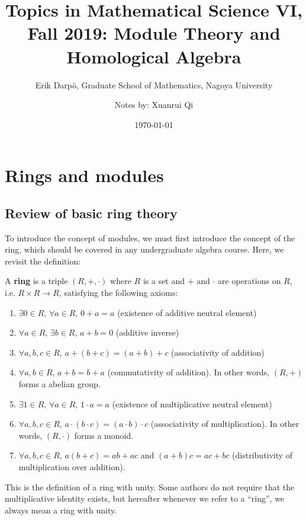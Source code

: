 \documentclass[12pt, a4paper, titlepage]{report}
\title{Topics in Mathematical Science VI, Fall 2019: Module Theory and Homological Algebra}
\date{\today}
\author{Erik Darp\"{o}, Graduate School of Mathematics, Nagoya University
  \and Notes by: Xuanrui Qi}
\begin{document}
\maketitle
\tableofcontents

\chapter{Rings and modules}

\section{Review of basic ring theory}

To introduce the concept of modules, we must first introduce the concept of the ring, which
should be covered in any undergraduate algebra course. Here, we revisit the definition:

\begin{defn}[ring]
  A \textbf{ring} is a triple $(R, +, \cdot)$ where $R$ is a set and $+$ and $\cdot$ are operations on $R$, i.e.
  $R \times R \rightarrow R$, satisfying the following axioms:
  \begin{enumerate}
  \item $\exists 0 \in R$, $\forall a \in R$, $0 + a = a$ (existence of additive neutral element)
  \item $\forall a \in R$, $\exists b \in R$, $a + b = 0$ (additive inverse)
  \item $\forall a, b, c \in R$, $a + (b + c) = (a + b) + c$ (associativity of addition)
  \item $\forall a, b \in R$, $a + b = b + a$ (commutativity of addition). In other words, $(R, +)$ forms a
    abelian group.
  \item $\exists 1 \in R$, $\forall a \in R$, $1 \cdot a = a$ (existence of multiplicative neutral element)
  \item $\forall a, b, c \in R$, $a \cdot (b \cdot c) = (a \cdot b) \cdot c$ (associativity of multiplication). In other
    words, $(R, \cdot)$ forms a monoid.
  \item $\forall a, b, c \in R$, $a(b + c) = ab + ac$ and $(a + b)c = ac + bc$ (distributivity of multiplication over
    addition).
  \end{enumerate}
\end{defn}

\begin{rem}
  This is the definition of a ring with unity. Some authors do not require that the multiplicative identity exists,
  but hereafter whenever we refer to a ``ring'', we always mean a ring with unity.
\end{rem}
\end{document}

